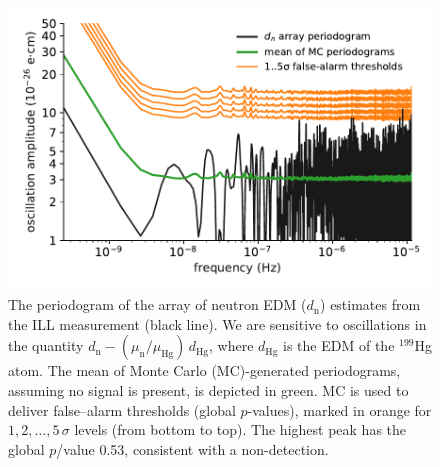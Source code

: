 \begin{figure}
  \centering
  \includegraphics[width=\columnwidth]{gfx/axions/detection_ill.pdf}
  \caption{The periodogram of the array of neutron EDM ($d_\mathrm{n}$) estimates from the ILL measurement (black line).
  We are sensitive to oscillations in the quantity $d_\mathrm{n} - \left( \mu_\mathrm{n} / \mu_\textrm{Hg} \right) \, d_\textrm{Hg}$, where $d_\textrm{Hg}$ is the EDM of the $^{199}$Hg atom. The mean of Monte Carlo (MC)-generated periodograms, assuming no signal is present, is depicted in green. MC is used to deliver false--alarm thresholds (global $p$-values), marked in orange for $1,2,…,5\,\sigma$ levels (from bottom to top). The highest peak has the global $p$\-/value 0.53, consistent with a non-detection.}
  \label{fig:ILL_detection}
\end{figure}

